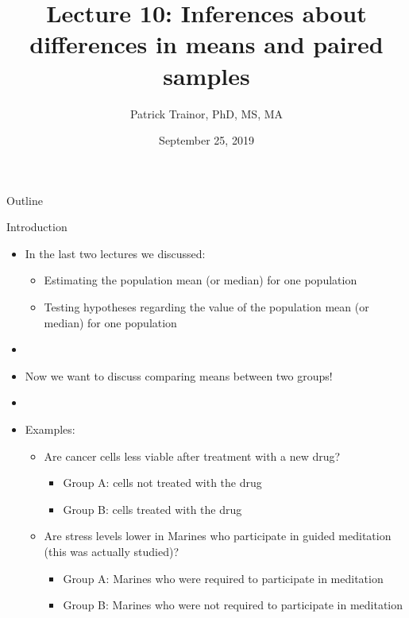 \documentclass[xcolor=dvipsnames]{beamer}
\title[Lecture 10]{Lecture 10: Inferences about differences in means and paired samples}
\author[Patrick Trainor]{Patrick Trainor, PhD, MS, MA}
\institute[NMSU]{New Mexico State University}
\date{September 25, 2019}
\begin{document}
\begin{frame}
\maketitle
\end{frame}

\begin{frame}{Outline}
\tableofcontents[hideallsubsections]
\end{frame}

\begin{frame}{Introduction}
	\begin{itemize}
		\item In the last two lectures we discussed:
		\begin{itemize}
			\item Estimating the population mean (or median) for one population
			\item Testing hypotheses regarding the value of the population mean (or median) for one population
		\end{itemize}
	\item[]
	\item Now we want to discuss comparing means between two groups!
	\item[]
	\item Examples:
	\begin{itemize}
		\item Are cancer cells less viable after treatment with a new drug? 
			\begin{itemize}
				\item Group A: cells not treated with the drug
				\item Group B: cells treated with the drug
			\end{itemize}
		\item Are stress levels lower in Marines who participate in guided meditation (this was actually studied)?
			\begin{itemize}
				\item Group A: Marines who were required to participate in meditation
				\item Group B: Marines who were not required to participate in meditation
			\end{itemize}
	\end{itemize}
	\end{itemize}
\end{frame}
\end{document}
